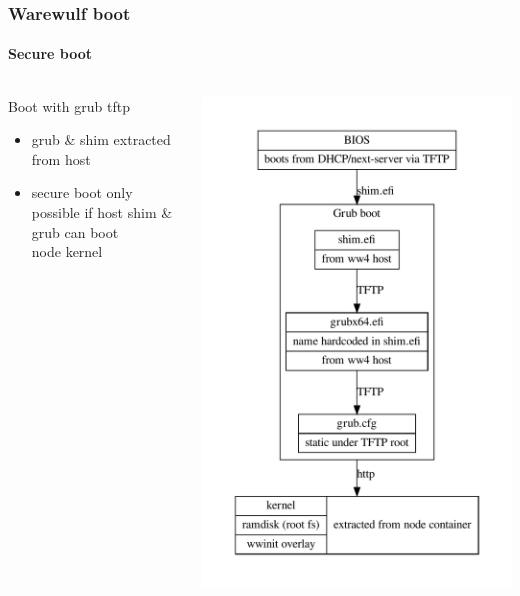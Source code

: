 \documentclass[aspectratio=169]{beamer}
\begin{document}
\begin{frame}[fragile]
\frametitle{Warewulf boot}
\framesubtitle{Secure boot }
\begin{columns}
\begin{block}{Boot with grub tftp}
\begin{itemize}
  \item grub \& shim extracted from host
  \item secure boot only possible if host shim \& grub can boot \\
  node kernel
\end{itemize}
\end{block}
\includegraphics[width=.7\linewidth]{grub_ipxe}
\end{columns}
\end{frame}
\end{document}
